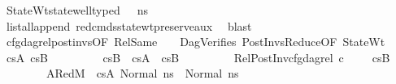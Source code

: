 \begin{isabellebody}
\ StateWt{}{\isacharcolon}{\kern0pt}{\isachardoublequoteopen}state{\isacharunderscore}{\kern0pt}well{\isacharunderscore}{\kern0pt}typed\ {\isasymLambda}\ {\isasymOmega}\ ns{}{\isacharprime}{\kern0pt}{\isacharprime}{\kern0pt}{\isachardoublequoteclose}\isanewline
\ \ \ \ \ \ \ \ \isamarkupfalse%
\ list{\isacharunderscore}{\kern0pt}all{\isacharunderscore}{\kern0pt}append\ red{\isacharunderscore}{\kern0pt}cmds{\isacharunderscore}{\kern0pt}state{\isacharunderscore}{\kern0pt}wt{\isacharunderscore}{\kern0pt}preserve{\isacharunderscore}{\kern0pt}aux\ \isamarkupfalse%
\ blast\isanewline
\ \ \ \ \ \ \ \ \isanewline
\ \ \ \ \ \ \isamarkupfalse%
\ cfg{\isacharunderscore}{\kern0pt}dag{\isacharunderscore}{\kern0pt}rel{\isacharunderscore}{\kern0pt}post{\isacharunderscore}{\kern0pt}invs{\isacharbrackleft}{\kern0pt}OF\ RelSame\ {\isacharunderscore}{\kern0pt}\ {\isacharunderscore}{\kern0pt}\ {\isacharunderscore}{\kern0pt}\ DagVerifies{}\ PostInvsReduce{\isacharbrackleft}{\kern0pt}OF\ StateWt{}{\isacharbrackright}{\kern0pt}{\isacharbrackright}{\kern0pt}\ \isamarkupfalse%
\ cs{}A{\isacharprime}{\kern0pt}{\isacharprime}{\kern0pt}{\isacharprime}{\kern0pt}\ cs{}B{\isacharprime}{\kern0pt}{\isacharprime}{\kern0pt}{\isacharprime}{\kern0pt}\isanewline
\ \ \ \ \ \ \ \ \ {\isachardoublequoteopen}cs{}B{\isacharprime}{\kern0pt}{\isacharprime}{\kern0pt}\ {\isacharequal}{\kern0pt}\ cs{}A{\isacharprime}{\kern0pt}{\isacharprime}{\kern0pt}{\isacharprime}{\kern0pt}\ {\isacharat}{\kern0pt}\ cs{}B{\isacharprime}{\kern0pt}{\isacharprime}{\kern0pt}{\isacharprime}{\kern0pt}{\isachardoublequoteclose}\ \isanewline
\ \ \ \ \ \ \ \ RelPostInv{\isacharcolon}{\kern0pt}{\isachardoublequoteopen}cfg{\isacharunderscore}{\kern0pt}dag{\isacharunderscore}{\kern0pt}rel\ c\ {\isacharbrackleft}{\kern0pt}{\isacharbrackright}{\kern0pt}\ {\isacharbrackleft}{\kern0pt}{\isacharbrackright}{\kern0pt}\ {\isacharbrackleft}{\kern0pt}{\isacharbrackright}{\kern0pt}\ {\isacharbrackleft}{\kern0pt}{\isacharbrackright}{\kern0pt}\ cs{}B{\isacharprime}{\kern0pt}{\isacharprime}{\kern0pt}{\isacharprime}{\kern0pt}{\isachardoublequoteclose}\ \isanewline
\ \ \ \ \ \ \ \ A{}Red{}{\isacharcolon}{\kern0pt}{\isachardoublequoteopen}{\isacharparenleft}{\kern0pt}M{\isacharcomma}{\kern0pt}{\isasymLambda}{\isacharcomma}{\kern0pt}{\isasymGamma}{\isacharcomma}{\kern0pt}{\isasymOmega}\ {\isasymturnstile}\ {\isasymlangle}cs{}A{\isacharprime}{\kern0pt}{\isacharprime}{\kern0pt}{\isacharprime}{\kern0pt}{\isacharcomma}{\kern0pt}\ Normal\ ns{}{\isacharprime}{\kern0pt}{\isacharprime}{\kern0pt}{\isasymrangle}\ {\isacharbrackleft}{\kern0pt}{\isasymrightarrow}{\isacharbrackright}{\kern0pt}\ Normal\ ns{}{\isacharprime}{\kern0pt}{\isacharprime}{\kern0pt}{\isacharparenright}{\kern0pt}{\isachardoublequoteclose}\ \isanewline

\end{isabellebody}
